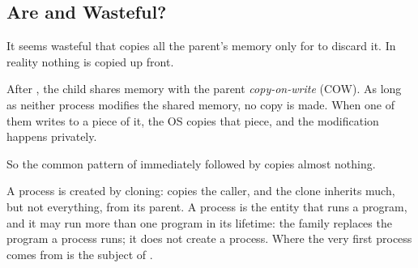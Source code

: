 \subsection{Are \texorpdfstring{}{fork()} and \texorpdfstring{}{exec()} Wasteful?}

It seems wasteful that  copies all the parent's memory only for  to discard it. In reality nothing is copied up front.

\begin{definition}
  After , the child shares memory with the parent \emph{copy-on-write} (COW). As long as neither process modifies the shared memory, no copy is made. When one of them writes to a piece of it, the OS copies that piece, and the modification happens privately.
\end{definition}

So the common pattern of  immediately followed by  copies almost nothing.

\begin{keypoint}[Summary]
  A process is created by cloning:  copies the caller, and the clone inherits much, but not everything, from its parent. A process is the entity that runs a program, and it may run more than one program in its lifetime: the  family replaces the program a process runs; it does not create a process. Where the very first process comes from is the subject of .
\end{keypoint}
